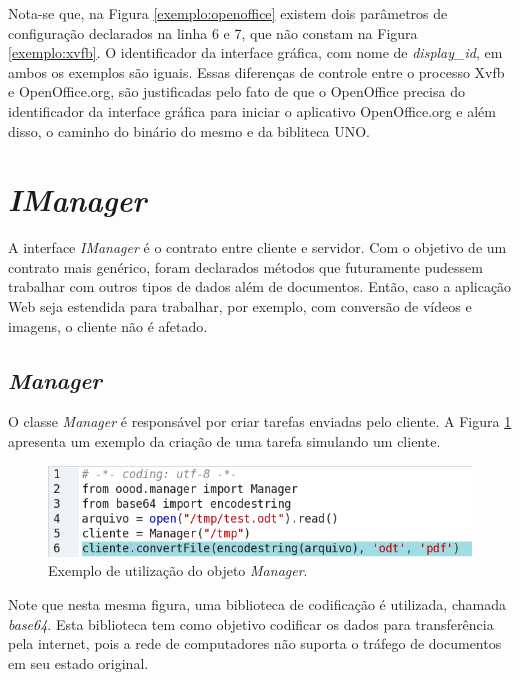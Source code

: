 Nota-se que, na Figura \ref{exemplo:openoffice} existem dois parâmetros de configuração declarados na linha 6 e 7, que não constam na Figura \ref{exemplo:xvfb}. O identificador da interface gráfica, com nome de \textit{display\_id}, em ambos os exemplos são iguais. Essas diferenças de controle entre o processo Xvfb e OpenOffice.org, são justificadas pelo fato de que o OpenOffice precisa do identificador da interface gráfica para iniciar o aplicativo OpenOffice.org e além disso, o caminho do binário do mesmo e da bibliteca UNO.

\section{\textit{IManager}}
\label{obj:manager}

A interface \textit{IManager} é o contrato entre cliente e servidor. Com o objetivo de um contrato mais genérico, foram declarados métodos que futuramente pudessem trabalhar com outros tipos de dados além de documentos. Então, caso a aplicação Web seja estendida para trabalhar, por exemplo, com conversão de vídeos e imagens, o cliente não é afetado.

\subsection{\textit{Manager}}

O classe \textit{Manager} é responsável por criar tarefas enviadas pelo cliente. A Figura \ref{exemplo:manager} apresenta um exemplo da criação de uma tarefa simulando um cliente.

\begin{figure}[ht]
\centering
\begin{center}
\includegraphics[scale=0.75,bb=0 20 500 85]{manager_exemplo.png}
\end{center}
\caption{Exemplo de utilização do objeto \textit{Manager}.}
\label{exemplo:manager}
\end{figure}

Note que nesta mesma figura, uma biblioteca de codificação é utilizada, chamada \textit{base64}. Esta biblioteca tem como objetivo codificar os dados para transferência pela internet, pois a rede de computadores não suporta o tráfego de documentos em seu estado original.

